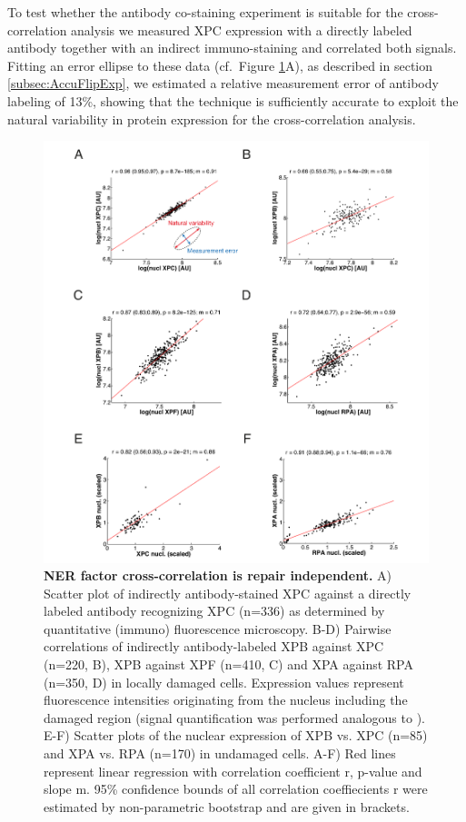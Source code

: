 To test whether the antibody co-staining experiment is suitable for the cross-correlation analysis we measured XPC expression with a directly labeled antibody together with an indirect immuno-staining and correlated both signals. Fitting an error ellipse to these data (cf.\ Figure \ref{fig:coExpressionData}A), as described in section  \ref{subsec:AccuFlipExp}, we estimated a relative measurement error of antibody labeling of 13\%, showing that the technique is sufficiently accurate to exploit the natural variability in protein expression for the cross-correlation analysis.
\begin{figure}[htbp]
	\begin{center}
		\includegraphics[width=1\textwidth]{Abbildungen/figureTAC_2.pdf}
		\caption{\textbf{NER factor cross-correlation is repair independent.} A) Scatter plot of indirectly antibody-stained XPC against a directly labeled antibody recognizing XPC (n=336) as determined by quantitative (immuno) fluorescence microscopy. B-D) Pairwise correlations of indirectly antibody-labeled XPB against XPC (n=220, B), XPB against XPF (n=410, C) and XPA against RPA (n=350, D) in locally damaged cells. Expression values represent fluorescence intensities originating from the nucleus including the damaged region (signal quantification was performed analogous to \cite{Luijsterburg2010}). E-F) Scatter plots of the nuclear expression of XPB vs. XPC (n=85) and XPA vs. RPA (n=170) in undamaged cells. A-F) Red lines represent linear regression with correlation coefficient r, p-value and slope m. 95\% confidence bounds of all correlation coeffiecients r were estimated by non-parametric bootstrap and are given in brackets. }
		\label{fig:coExpressionData}
	\end{center}
\end{figure}

